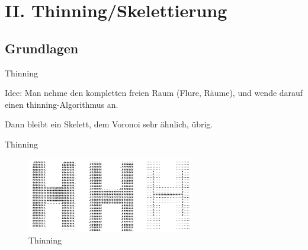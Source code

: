 \section{II. Thinning/Skelettierung}
\subsection{Grundlagen}
\begin{frame}{Thinning}
\begin{center}
 Idee: Man nehme den kompletten freien Raum (Flure, Räume), und wende darauf einen thinning-Algorithmus an.
 \bigbreak
 
 Dann bleibt ein Skelett, dem Voronoi sehr ähnlich, übrig.
 
 \end{center}
\end{frame}

\begin{frame}{Thinning}

\begin{figure}[h]
 \centering
 \includegraphics[width=0.65\textwidth]{./material/thinning1.png}
 \caption{Thinning \cite{ZhangSuen}}
 \label{fig:gesamt}
\end{figure}
 
\end{frame}

